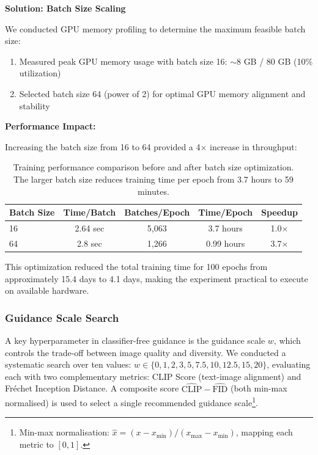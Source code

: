 \textbf{Solution: Batch Size Scaling}

We conducted GPU memory profiling to determine the maximum feasible batch size:

\begin{enumerate}
    \item Measured peak GPU memory usage with batch size 16: $\sim$8 GB / 80 GB (10\% utilization)
    \item Selected batch size 64 (power of 2) for optimal GPU memory alignment and stability
\end{enumerate}

\textbf{Performance Impact:}

Increasing the batch size from 16 to 64 provided a 4$\times$ increase in throughput:

\begin{table}[htbp]
\centering
\begin{tabular}{lcccc}
\toprule
\textbf{Batch Size} & \textbf{Time/Batch} & \textbf{Batches/Epoch} & \textbf{Time/Epoch} & \textbf{Speedup} \\
\midrule
16 & 2.64 sec & 5,063 & 3.7 hours & 1.0$\times$ \\
64 & 2.8 sec & 1,266 & 0.99 hours & 3.7$\times$ \\
\bottomrule
\end{tabular}
\caption{Training performance comparison before and after batch size optimization. The larger batch size reduces training time per epoch from 3.7 hours to 59 minutes.}
\label{tab:wikiart-batch-size-optimization}
\end{table}

This optimization reduced the total training time for 100 epochs from approximately 15.4 days to 4.1 days, making the experiment practical to execute on available hardware.

\subsubsection{Guidance Scale Search}
\label{sec:wikiart-guidance-search}

A key hyperparameter in classifier-free guidance is the guidance scale $w$, which controls the
trade-off between image quality and diversity.  We conducted a systematic search over ten values:
$w \in \{0, 1, 2, 3, 5, 7.5, 10, 12.5, 15, 20\}$, evaluating each with two complementary metrics:
CLIP Score (text-image alignment) and Fr\'{e}chet Inception Distance. A composite score $\hat{\text{CLIP}} - \hat{\text{FID}}$ (both min-max
normalised) is used to select a single recommended guidance scale\footnote{%
  Min-max normalisation: $\hat{x} = (x - x_{\min})/(x_{\max} - x_{\min})$, mapping each metric to $[0,1]$.}.

